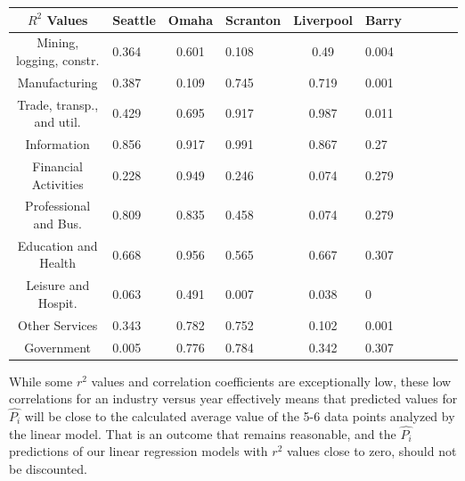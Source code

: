 \documentclass{article}
\begin{document}
\begin{table}[ht]
\centering
\begin{tabularx}{\linewidth}{|c|X|c|X|c|X|c|X|c|X|}
\hline
    $R^2$ Values & Seattle & Omaha & Scranton & Liverpool & Barry \\
    \hline
    Mining, logging, constr. & 0.364 & 0.601 & 0.108 & 0.49 & 0.004 \\
    \hline
    Manufacturing & 0.387 & 0.109 & 0.745 & 0.719 & 0.001 \\
    \hline
    Trade, transp., and util. & 0.429 & 0.695 & 0.917 & 0.987 & 0.011 \\
    \hline
    Information & 0.856 & 0.917 & 0.991 & 0.867 & 0.27 \\
    \hline
    Financial Activities & 0.228 & 0.949 & 0.246 & 0.074 & 0.279 \\
    \hline
    Professional and Bus. & 0.809 & 0.835 & 0.458 & 0.074 & 0.279 \\
    \hline
    Education and Health & 0.668 & 0.956 & 0.565 & 0.667 & 0.307 \\
    \hline
    Leisure and Hospit. & 0.063 & 0.491 & 0.007 & 0.038 & 0 \\
    \hline
    Other Services & 0.343 & 0.782 & 0.752 & 0.102 & 0.001 \\
    \hline
    Government & 0.005 & 0.776 & 0.784 & 0.342 & 0.307 \\
    \hline
\end{tabularx}
\end{table}
While some $r^2$ values and correlation coefficients are exceptionally low, these low correlations for an industry versus year effectively means that predicted values for $\hat{P_i}$ will be close to the calculated average value of the 5-6 data points analyzed by the linear model. That is an outcome that remains reasonable, and the $\hat{P_i}$ predictions of our linear regression models with $r^2$ values close to zero, should not be discounted. 
\end{document}
